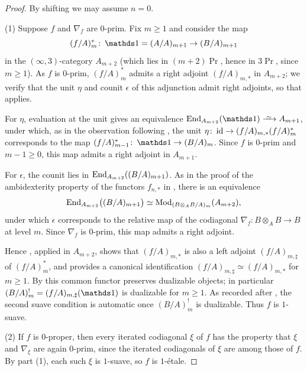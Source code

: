 \documentclass[11pt]{book}
\begin{document}
	\begin{proof}
		By shifting we may assume $n = 0$.

		(1) Suppose $f$ and $\nabla_f$ are $0$-prim. Fix $m \geq 1$ and consider the map
		\[
			(f/A)^*_m\colon \unit = (A/A)_{m+1} \to (B/A)_{m+1}
		\]
		in the $(\infty,3)$-category $A_{m+2}$ (which lies in $(m+2)\Pr$, hence in $3\Pr$, since $m \geq 1$). As $f$ is $0$-prim, $(f/A)^*_m$ admits a right adjoint $(f/A)_{m,*}$ in $A_{m+2}$; we verify that the unit $\eta$ and counit $\epsilon$ of this adjunction admit right adjoints, so that  applies.

		For $\eta$, evaluation at the unit gives an equivalence $\End_{A_{m+2}}(\unit) \iso A_{m+1}$, under which, as in the observation following , the unit $\eta\colon \operatorname{id} \to (f/A)_{m,*}(f/A)^*_m$ corresponds to the map $(f/A)^*_{m-1}\colon \unit \to (B/A)_m$. Since $f$ is $0$-prim and $m - 1 \geq 0$, this map admits a right adjoint in $A_{m+1}$.

		For $\epsilon$, the counit lies in $\operatorname{End}_{A_{m+2}}((B/A)_{m+1})$. As in the proof of the ambidexterity property of the functors $f_{n,*}$ in , there is an equivalence
		\[
			\operatorname{End}_{A_{m+2}}\bigl((B/A)_{m+1}\bigr) \simeq {\textup{Mod}}_{(B \otimes_A B/A)_m}(A_{m+2}),
		\]
		under which $\epsilon$ corresponds to the relative map of the codiagonal $\nabla_f\colon B \otimes_A B \to B$ at level $m$. Since $\nabla_f$ is $0$-prim, this map admits a right adjoint.

		Hence , applied in $A_{m+2}$, shows that $(f/A)_{m,*}$ is also a left adjoint $(f/A)_{m,\sharp}$ of $(f/A)^*_m$, and provides a canonical identification $(f/A)_{m,\sharp} \simeq (f/A)_{m,*}$ for $m \geq 1$. By  this common functor preserves dualizable objects; in particular $(B/A)^!_m = (f/A)_{m,\sharp}(\unit)$ is dualizable for $m \geq 1$. As recorded after , the second suave condition is automatic once $(B/A)^!_m$ is dualizable. Thus $f$ is $1$-suave.

		(2) If $f$ is $0$-proper, then every iterated codiagonal $\xi$ of $f$ has the property that $\xi$ and $\nabla_{\xi}$ are again $0$-prim, since the iterated codiagonals of $\xi$ are among those of $f$. By part (1), each such $\xi$ is $1$-suave, so $f$ is $1$-\'etale.


\end{proof}
\end{document}
